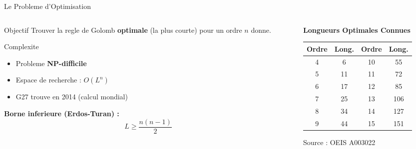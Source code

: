 \documentclass[aspectratio=169,9pt]{beamer}
\begin{document}
\begin{frame}{Le Probleme d'Optimisation}
    \begin{columns}[T]
        \begin{column}{0.48\textwidth}
            \begin{block}{Objectif}
                Trouver la regle de Golomb \textbf{optimale} (la plus courte) pour un ordre $n$ donne.
            \end{block}
            \vspace{0.1cm}
            \begin{alertblock}{Complexite}
                \begin{itemize}\small
                    \item Probleme \textbf{NP-difficile}
                    \item Espace de recherche : $O(L^n)$
                    \item G27 trouve en 2014 (calcul mondial)
                \end{itemize}
            \end{alertblock}
            \vspace{0.1cm}
            \textbf{Borne inferieure (Erdos-Turan) :}
            \[ L \geq \frac{n(n-1)}{2} \]
        \end{column}
        \begin{column}{0.48\textwidth}
            \centering
            \textbf{Longueurs Optimales Connues}\\[0.1cm]
            \small
            \begin{tabular}{cc|cc}
                \toprule
                \textbf{Ordre} & \textbf{Long.} & \textbf{Ordre} & \textbf{Long.} \\
                \midrule
                4 & 6 & 10 & 55 \\
                5 & 11 & 11 & 72 \\
                6 & 17 & 12 & 85 \\
                7 & 25 & 13 & 106 \\
                8 & 34 & 14 & 127 \\
                9 & 44 & 15 & 151 \\
                \bottomrule
            \end{tabular}
            \vspace{0.2cm}
            {\footnotesize Source : OEIS A003022}
        \end{column}
    \end{columns}
\end{frame}
\end{document}
